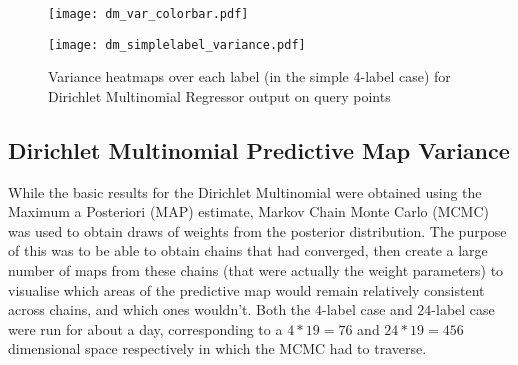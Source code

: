 \begin{figure}[H]
    \begin{minipage}{\linewidth}
        \centerline{\texttt{[image: dm\_var\_colorbar.pdf]}}
        \centerline{\texttt{[image: dm\_simplelabel\_variance.pdf]}}
        \caption{Variance heatmaps over each label (in the simple 4-label case) for Dirichlet Multinomial Regressor output on query points}
        \label{fig:dm_4label_variance}
    \end{minipage}
    \hfill
\end{figure}

\subsection{Dirichlet Multinomial Predictive Map Variance}

While the basic results for the Dirichlet Multinomial were obtained using the Maximum a Posteriori (MAP) estimate, Markov Chain Monte Carlo (MCMC) was used to obtain draws of weights from the posterior distribution. The purpose of this was to be able to obtain chains that had converged, then create a large number of maps from these chains (that were actually the weight parameters) to visualise which areas of the predictive map would remain relatively consistent across chains, and which ones wouldn't. Both the $4$-label case and $24$-label case were run for about a day, corresponding to a $4*19=76$ and $24*19=456$ dimensional space respectively in which the MCMC had to traverse.


